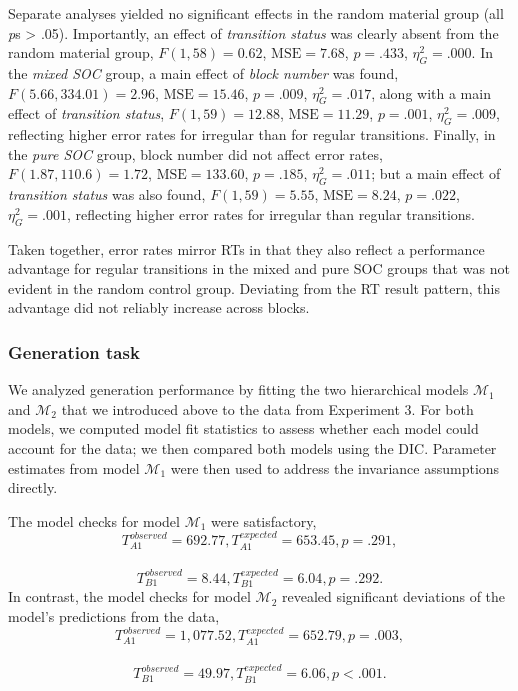 \documentclass[man]{apa6}
\theoremstyle{definition}
\theoremstyle{definition}
\theoremstyle{definition}
\theoremstyle{remark}
\begin{document}
Separate analyses yielded no significant effects in the random material
group (all \emph{p}s \textgreater{} .05). Importantly, an effect of
\emph{transition status} was clearly absent from the random material
group, \(F(1, 58) = 0.62\), \(\mathrm{MSE} = 7.68\), \(p = .433\),
\(\eta^2_G = .000\). In the \emph{mixed SOC} group, a main effect of
\emph{block number} was found, \(F(5.66, 334.01) = 2.96\),
\(\mathrm{MSE} = 15.46\), \(p = .009\), \(\eta^2_G = .017\), along with
a main effect of \emph{transition status}, \(F(1, 59) = 12.88\),
\(\mathrm{MSE} = 11.29\), \(p = .001\), \(\eta^2_G = .009\), reflecting
higher error rates for irregular than for regular transitions. Finally,
in the \emph{pure SOC} group, block number did not affect error rates,
\(F(1.87, 110.6) = 1.72\), \(\mathrm{MSE} = 133.60\), \(p = .185\),
\(\eta^2_G = .011\); but a main effect of \emph{transition status} was
also found, \(F(1, 59) = 5.55\), \(\mathrm{MSE} = 8.24\), \(p = .022\),
\(\eta^2_G = .001\), reflecting higher error rates for irregular than
regular transitions.

Taken together, error rates mirror RTs in that they also reflect a
performance advantage for regular transitions in the mixed and pure SOC
groups that was not evident in the random control group. Deviating from
the RT result pattern, this advantage did not reliably increase across
blocks.

\subsubsection{Generation task}\label{generation-task-2}

We analyzed generation performance by fitting the two hierarchical
models \(\mathcal{M}_1\) and \(\mathcal{M}_2\) that we introduced above
to the data from Experiment 3. For both models, we computed model fit
statistics to assess whether each model could account for the data; we
then compared both models using the DIC. Parameter estimates from model
\(\mathcal{M}_1\) were then used to address the invariance assumptions
directly.

The model checks for model \(\mathcal{M}_1\) were satisfactory,
\[T_{A1}^{observed} = 692.77, T_{A1}^{expected} = 653.45, p = .291,\]~
\[T_{B1}^{observed} = 8.44, T_{B1}^{expected} = 6.04, p = .292.\] In
contrast, the model checks for model \(\mathcal{M}_2\) revealed
significant deviations of the model's predictions from the data,
\[T_{A1}^{observed} = 1,077.52, T_{A1}^{expected} = 652.79, p = .003,\]~
\[T_{B1}^{observed} = 49.97, T_{B1}^{expected} = 6.06, p < .001.\]
\end{document}
